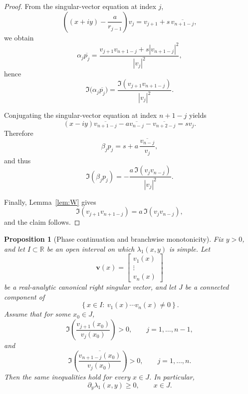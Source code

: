 \documentclass[11pt]{article}
\numberwithin{equation}{section}
\newtheorem{proposition}[theorem]{Proposition}
\begin{document}
\begin{proof}
From the singular-vector equation at index $j$,
\[
\left((x+iy)-\frac{a}{r_{j-1}}\right)v_j
=
v_{j+1}+s\,\overline{v_{n+1-j}},
\]
we obtain
\[
\alpha_j\overline{p_j}
=
\frac{v_{j+1}v_{n+1-j}+s|v_{n+1-j}|^2}{|v_j|^2},
\]
hence
\[
\Im\!\bigl(\alpha_j\overline{p_j}\bigr)
=
\frac{\Im(v_{j+1}v_{n+1-j})}{|v_j|^2}.
\]

Conjugating the singular-vector equation at index $n+1-j$ yields
\[
(x-iy)\overline{v_{n+1-j}}
-
a\overline{v_{n-j}}
-
\overline{v_{n+2-j}}
=
sv_j.
\]
Therefore
\[
\beta_j p_j
=
s+a\,\frac{\overline{v_{n-j}}}{v_j},
\]
and thus
\[
\Im(\beta_jp_j)
=
-\frac{a\,\Im(v_jv_{n-j})}{|v_j|^2}.
\]

Finally, Lemma~\ref{lem:W} gives
\[
\Im(v_{j+1}v_{n+1-j})=a\,\Im(v_jv_{n-j}),
\]
and the claim follows.
\end{proof}

\begin{proposition}[Phase continuation and branchwise monotonicity]
\label{prop:continuation}
Fix $y>0$, and let $I\subset\mathbb{R}$ be an open interval on which
$\lambda_1(x,y)$ is simple.  Let
\[
\bm v(x)=
\begin{bmatrix}
v_1(x)\\
\vdots\\
v_n(x)
\end{bmatrix}
\]
be a real-analytic canonical right singular vector, and let $J$ be a connected
component of
\[
\left\{
x\in I:\ v_1(x)\cdots v_n(x)\neq0
\right\}.
\]
Assume that for some $x_0\in J$,
\[
\Im\!\left(\frac{v_{j+1}(x_0)}{v_j(x_0)}\right)>0,
\qquad
j=1,\dots,n-1,
\]
and
\[
\Im\!\left(\frac{\overline{v_{n+1-j}(x_0)}}{v_j(x_0)}\right)>0,
\qquad
j=1,\dots,n.
\]
Then the same inequalities hold for every $x\in J$.  In particular,
\[
\partial_y\lambda_1(x,y)\ge0,
\qquad x\in J.
\]
\end{proposition}
\end{document}
